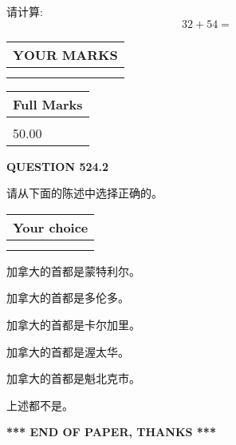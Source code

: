 \documentclass{ctexart}
\begin{document}
  
 
请计算:
\begin{equation}
32 +  %
54 = \nonumber
\end{equation}
 

 

 
  
\vspace{0.2in}
  
\noindent\begin{tabular}{|l|}
\hline
 YOUR MARKS  \\
\hline
 \\ 
 \\ 
\hline
\end{tabular}
\hspace{0.05in} \begin{tabular}{|l|}
\hline
 Full Marks  \\
\hline
 \\ 
50.00 \\
\hline
\end{tabular}
{\textbf{\Large{QUESTION
524.2 
}}}
  
  
请从下面的陈述中选择正确的。
  
  
\noindent\hspace{3.0in} \begin{tabular}{|l|}
\hline
Your choice \\
\hline
 \\ 
 \\ 
\hline
\end{tabular}
  
  
 
 
加拿大的首都是蒙特利尔。
 
 
加拿大的首都是多伦多。
 
 
加拿大的首都是卡尔加里。
 
 
加拿大的首都是渥太华。
 
 
加拿大的首都是魁北克市。
 
 
 上述都不是。
 
 
   
   
 \vspace{0.2in}
 
   
   
   
   
\vspace{1.0in} 
{\textbf{\large{ *** END OF PAPER, THANKS *** }}} 
   
\end{document}
